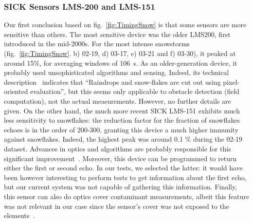 \subsubsection{SICK Sensors LMS-200 and LMS-151}
Our first conclusion based on fig.~\ref{fig:TimingSnow} is that some sensors are more sensitive than others. The most sensitive device was the older LMS200, first introduced in the mid-2000s. For the most intense snowstorms (fig.~\ref{fig:TimingSnow}. b) 02-19, d) 03-17, e) 03-21 and f) 03-30), it peaked at around 15\%, for averaging windows of \SI{106}{\second}. As an older-generation device, it probably used unsophisticated algorithms and sensing. Indeed, its technical description~\cite{LMS200Manual} indicates that ``Raindrops and snow-flakes are cut out using pixel-oriented evaluation'', but this seems only applicable to  obstacle detection (field computation), not the actual measurements. However, no further details are given. On the other hand, the much more recent SICK LMS-151 exhibits much less sensitivity to snowflakes: the reduction factor for the fraction of snowflakes echoes is in the order of 200-300, granting this device a much higher immunity against snowflakes. Indeed, the highest peak was around 0.1 \% during the 02-19 dataset. Advances in optics and algorithms are probably responsible for this significant improvement~. Moreover, this device can be programmed to return either the first or second echo. In our tests, we selected the latter: it would have been however interesting to perform tests to get information about the first echo, but our current system was not capable of gathering this information. Finally, this sensor can also do optics cover contaminant measurements, albeit this feature was not relevant in our case since the sensor's cover was not exposed to the elements~.

